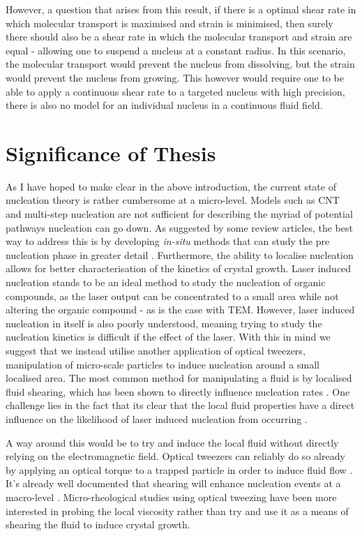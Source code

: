 However, a question that arises from this result, if there is 
a optimal shear rate in which molecular transport is maximised 
and strain is minimised, then surely there should also be a shear 
rate in which the molecular transport and strain are equal - 
allowing one to suspend a nucleus at a constant radius. In this 
scenario, the molecular transport would prevent the nucleus from 
dissolving, but the strain would prevent the nucleus from growing. 
This however would require one to be able to apply a continuous 
shear rate to a targeted nucleus with high precision, there is 
also no model for an individual nucleus in a continuous fluid 
field. 



\section{Significance of Thesis}
As I have hoped to make clear in the above introduction, the 
current state of nucleation theory is rather cumbersome at a 
micro-level. Models such as CNT and multi-step nucleation are 
not sufficient for describing the myriad of potential pathways 
nucleation can go down. As suggested by some review articles, 
the best way to address this is by developing \textit{in-situ} 
methods that can study the pre nucleation phase in greater detail 
\cite{Fu2021}. Furthermore, the ability to localise nucleation 
allows for better characterisation of the kinetics of crystal 
growth. Laser induced nucleation stands to be an ideal method to 
study the nucleation of organic compounds, as the laser output 
can be concentrated to a small area \cite{Korede2023} while not 
altering the organic compound - as is the case with TEM. However,
laser induced nucleation in itself is also poorly understood, 
meaning trying to study the nucleation kinetics is difficult if the
effect of the laser. With this in mind we suggest that we instead 
utilise another application of optical tweezers, manipulation 
of micro-scale particles to induce nucleation around a small 
localised area. The most common method for manipulating a fluid is 
by localised fluid shearing, which has been shown to directly 
influence nucleation rates \cite{Debuysschere2023}. 
One challenge lies in the fact that its clear that the local fluid 
properties have a direct influence on the likelihood of laser
induced nucleation from occurring \cite{Korede2023, Ward2016,
	Yuyama2012, Liao2022}. 

A way around this would be to try and induce the local fluid 
without directly relying on the electromagnetic field. Optical 
tweezers can reliably do so already by applying an optical 
torque to a trapped particle in order to induce fluid flow 
\cite{Bishop2004, RobertsonAnderson2018}. It's already well
documented that shearing will enhance nucleation events at a
macro-level \cite{Debuysschere2023}. Micro-rheological studies 
using optical tweezing have been more interested in probing 
the local viscosity rather than try and use it as a means of 
shearing the fluid to induce crystal growth. 

